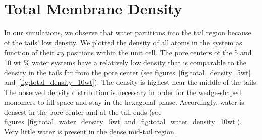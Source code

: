 \documentclass{article}
\begin{document}
  \section{Total Membrane Density}\label{section:total_density}
  
  In our simulations, we observe that water partitions into the tail region
  because of the tails' low density. We plotted the density of all atoms in 
  the system as function of their $xy$ positions within the unit cell. The 
  pore centers of the 5 and 10 wt \% water systems have a relatively low density
  that is comparable to the density in the tails far from the pore center
  (see figures~\ref{fig:total_density_5wt} and~\ref{fig:total_density_10wt}).
  The density is highest near the middle of the tails. The observed density distribution
  is necessary in order for the wedge-shaped monomers to fill space and stay in
  the hexagonal phase. Accordingly, water is densest in the pore center and at 
  the tail ends (see figures~\ref{fig:total_water_density_5wt} 
  and~\ref{fig:total_water_density_10wt}). Very little water is present in the 
  dense mid-tail region. 
  
\end{document}
